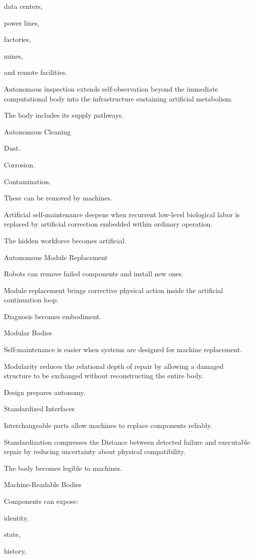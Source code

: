data centers,

power lines,

factories,

mines,

and remote facilities.

Autonomous inspection extends self-observation beyond the immediate computational body into the infrastructure sustaining artificial metabolism.

The body includes its supply pathways.

Autonomous Cleaning

Dust.

Corrosion.

Contamination.

These can be removed by machines.

Artificial self-maintenance deepens when recurrent low-level biological labor is replaced by artificial correction embedded within ordinary operation.

The hidden workforce becomes artificial.

Autonomous Module Replacement

Robots can remove failed components and install new ones.

Module replacement brings corrective physical action inside the artificial continuation loop.

Diagnosis becomes embodiment.

Modular Bodies

Self-maintenance is easier when systems are designed for machine replacement.

Modularity reduces the relational depth of repair by allowing a damaged structure to be exchanged without reconstructing the entire body.

Design prepares autonomy.

Standardized Interfaces

Interchangeable parts allow machines to replace components reliably.

Standardization compresses the Distance between detected failure and executable repair by reducing uncertainty about physical compatibility.

The body becomes legible to machines.

Machine-Readable Bodies

Components can expose:

identity,

state,

history,


